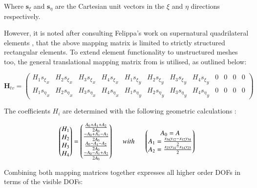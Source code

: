 Where $\mathbf{s}_\xi$ and $\mathbf{s}_\eta$ are the Cartesian unit vectors in the $\xi$ and $\eta$ directions respectively.

However, it is noted after consulting Felippa's work on supernatural quadrilateral elements \cite{felippa2006supernatural}, that the above mapping matrix is limited to strictly structured rectangular elements. To extend element functionality to unstructured meshes too, the general translational mapping matrix from \cite{felippa2006supernatural} is utilised, as outlined below:

\begin{equation} 
\mathbf{H}_{tv} =
\begin{pmatrix}
H_1{s_\xi}_x & H_2{s_\xi}_x & H_3{s_\xi}_x & H_4{s_\xi}_x & H_1{s_\xi}_y & H_2{s_\xi}_y & H_3{s_\xi}_y & H_4{s_\xi}_y & 0 & 0 & 0 & 0 \\
H_1{s_\eta}_x & H_2{s_\eta}_x & H_3{s_\eta}_x & H_4{s_\eta}_x & H_1{s_\eta}_y & H_2{s_\eta}_y & H_3{s_\eta}_y & H_4{s_\eta}_y & 0 & 0 & 0 & 0
\end{pmatrix}
\label{equation10_1}
\end{equation}

The coefficients $H_i$ are determined with the following geometric calculations \cite{felippa2006supernatural}:

\begin{equation} 
\begin{pmatrix}
H_1 \\
H_2 \\
H_3 \\
H_4
\end{pmatrix}
=
\begin{pmatrix}
\frac{A_0 + A_1 + A_2}{2A_0} \\
\frac{-A_0 + A_1 - A_2}{2A_0} \\
\frac{A_0 - A_1 - A_2}{2A_0} \\
\frac{-A_0 - A_1 + A_2}{2A_0}
\end{pmatrix}
\hspace{5mm}
with
\hspace{5mm}
\begin{pmatrix}
A_0 = A \\
A_1 = \frac{x_{34} y_{12} - x_{12} y_{34}}{2} \\
A_2 = \frac{x_{23} y_{14} - x_{14} y_{23}}{2}
\end{pmatrix}
\label{equation10_2}
\end{equation}

Combining both mapping matrices together expresses all higher order DOFs in terms of the visible DOFs:


